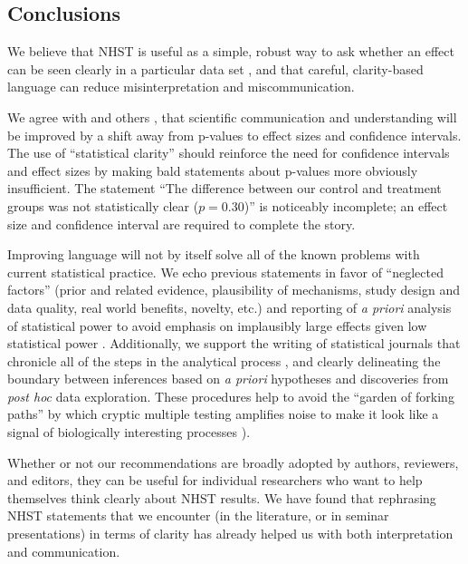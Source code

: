 \documentclass[12pt, english, dvipsnames, table]{article} %
\newcommand{\pvals}{p-values\xspace}
\begin{document}
\subsection*{Conclusions}

\noindent We believe that NHST is useful as a simple, robust way to ask whether an effect can be seen clearly in a particular data set \citep{robinson2001past}, and that careful, clarity-based language can reduce misinterpretation and miscommunication.

We agree with \citet{Cohen1994} and others \citep{Goodman1999, ZiliakandMcCloskey2008, WassersteinandLazar2016}, that scientific communication and understanding will be improved by a shift away from \pvals to effect sizes and confidence intervals. The use of ``statistical clarity'' should reinforce the need for confidence intervals and effect sizes by making bald statements about \pvals more obviously insufficient. The statement ``The difference between our control and treatment groups was not statistically clear ($p = 0.30$)'' is noticeably incomplete; an effect size and confidence interval are required to complete the story.

Improving language will not by itself solve all of the known problems with current statistical practice. We echo previous statements in favor of ``neglected factors'' (prior and related evidence, plausibility of mechanisms, study design and data quality, real world benefits, novelty, etc.) \citep{McShaneetal.2017} and reporting of \emph{a priori} analysis of statistical power to avoid emphasis on implausibly large effects given low statistical power \citep[the ``winner's curse''][]{GelmanandCarlin2014, SzucsandIoannidis2017, Bernardietal.2017}. Additionally, we support the writing of statistical journals that chronicle all of the steps in the analytical process \citep{Kassetal.2016}, and clearly delineating the boundary between inferences based on \emph{a priori} hypotheses and discoveries from \emph{post hoc} data exploration. These procedures help to avoid the ``garden of forking paths'' by which cryptic multiple testing amplifies noise to make it look like a signal of biologically interesting processes \citep{gelman_statistical_2014}). 

Whether or not our recommendations are broadly adopted by authors, reviewers, and editors, they can be useful for individual researchers who want to help themselves think clearly about NHST results. We have found that rephrasing NHST statements that we encounter (in the literature, or in seminar presentations) in terms of clarity has already helped us with both interpretation and communication.
\end{document}
